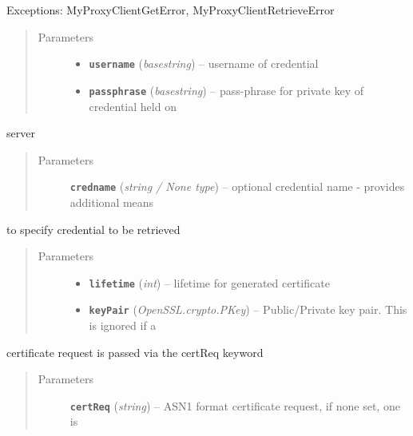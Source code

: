 \documentclass[letterpaper,10pt,english]{sphinxmanual}
\begin{document}
\begin{fulllineitems}
\begin{fulllineitems}
Exceptions:  MyProxyClientGetError, MyProxyClientRetrieveError
\begin{quote}\begin{description}
\item[{Parameters}] \leavevmode\begin{itemize}
\item {} 
\textbf{\texttt{username}} (\emph{basestring}) -- username of credential

\item {} 
\textbf{\texttt{passphrase}} (\emph{basestring}) -- pass-phrase for private key of credential held on

\end{itemize}

\end{description}\end{quote}

server
\begin{quote}\begin{description}
\item[{Parameters}] \leavevmode
\textbf{\texttt{credname}} (\emph{string / None type}) -- optional credential name - provides additional means

\end{description}\end{quote}

to specify credential to be retrieved
\begin{quote}\begin{description}
\item[{Parameters}] \leavevmode\begin{itemize}
\item {} 
\textbf{\texttt{lifetime}} (\emph{int}) -- lifetime for generated certificate

\item {} 
\textbf{\texttt{keyPair}} (\emph{OpenSSL.crypto.PKey}) -- Public/Private key pair.  This is ignored if a

\end{itemize}

\end{description}\end{quote}

certificate request is passed via the certReq keyword
\begin{quote}\begin{description}
\item[{Parameters}] \leavevmode
\textbf{\texttt{certReq}} (\emph{string}) -- ASN1 format certificate request, if none set, one is


\end{description}
\end{quote}
\end{fulllineitems}
\end{fulllineitems}
\end{document}
